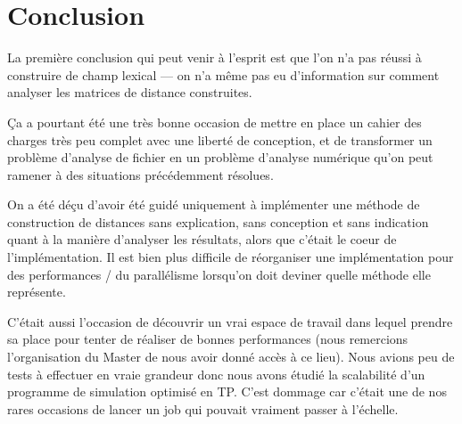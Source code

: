 \section{Conclusion}

La première conclusion qui peut venir à l'esprit est que
l'on n'a pas réussi à construire de champ lexical \----
on n'a même pas eu d'information sur comment analyser
les matrices de distance construites.

Ça a pourtant été une très bonne occasion de
mettre en place un cahier des charges très peu complet
avec une liberté de conception, et de transformer un
problème d'analyse de fichier en un problème d'analyse numérique
qu'on peut ramener à des situations précédemment résolues.

On a été déçu d'avoir été guidé uniquement à implémenter
une méthode de construction de distances sans explication,
sans conception et sans indication quant à la manière
d'analyser les résultats, alors que c'était le coeur
de l'implémentation. Il est bien plus difficile de réorganiser
une implémentation pour des performances / du parallélisme
lorsqu'on doit deviner quelle méthode elle représente.

C'était aussi l'occasion de découvrir un vrai espace
de travail dans lequel prendre sa place pour tenter de
réaliser de bonnes performances
(nous remercions l'organisation du Master de nous avoir donné
accès à ce lieu).
Nous avions peu de tests à effectuer en vraie grandeur donc
nous avons étudié la scalabilité d'un programme de simulation
optimisé en TP. C'est dommage car c'était une de nos rares occasions
de lancer un job qui pouvait vraiment passer à l'échelle.
